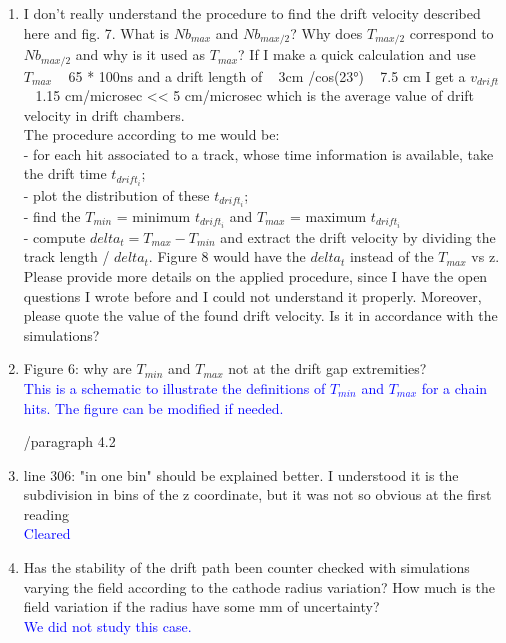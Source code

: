 \documentclass[a4paper,11pt,twoside]{article}
\begin{document}
\begin{enumerate}
\item I don't really understand the procedure to find the drift velocity 
   described here and fig. 7. What is $Nb_{max}$ and $Nb_{max/2}$? Why does 
   $T_{max/2}$ correspond to $Nb_{max/2}$ and why is it used as $T_{max}$? If I 
   make a quick calculation and use $T_{max}$ ~ 65 * 100ns and a drift length 
   of ~ 3cm /cos(23°) ~ 7.5 cm I get a $v_{drift}$ ~ 1.15 cm/microsec << 5 
   cm/microsec which is the average value of drift velocity in drift 
   chambers.\\
The procedure according to me would be:\\
- for each hit associated to a track, whose time information is available, take 
the drift time $t_{drift_{i}}$;\\
- plot the distribution of these $t_{drift_{i}}$;\\
- find the $T_{min}$ = minimum $t_{drift_{i}}$ and $T_{max}$ = maximum 
$t_{drift_{i}}$\\
- compute $delta_{t} = T_{max} - T_{min}$ and extract the drift velocity by 
dividing the track length / $delta_{t}$. Figure 8 would have the $delta_{t}$ 
instead of the $T_{max}$ vs z.\\
Please provide more details on the applied procedure, since I have the open 
questions I wrote before and I could not understand it properly. Moreover, 
please quote the value of the found drift velocity. Is it in accordance with 
the simulations?\\
\textcolor{blue}{ } 

\item Figure 6: why are $T_{min}$ and $T_{max}$ not at the drift gap 
   extremities?\\
   \textcolor{blue}{This is a schematic to illustrate the definitions of 
   $T_{min}$ and $T_{max}$ for a chain hits. The figure can be modified if 
needed.} 

        /paragraph 4.2

\item line 306: "in one bin" should be explained better. I understood it is the 
   subdivision in bins of the z coordinate, but it was not so obvious at the 
   first reading\\
\textcolor{blue}{Cleared} 

\item Has the stability of the drift path been counter checked with simulations 
   varying the field according to the cathode radius variation? How much is the 
   field variation if the radius have some mm of uncertainty?\\
\textcolor{blue}{We did not study this case.} 


\end{enumerate}
\end{document}
